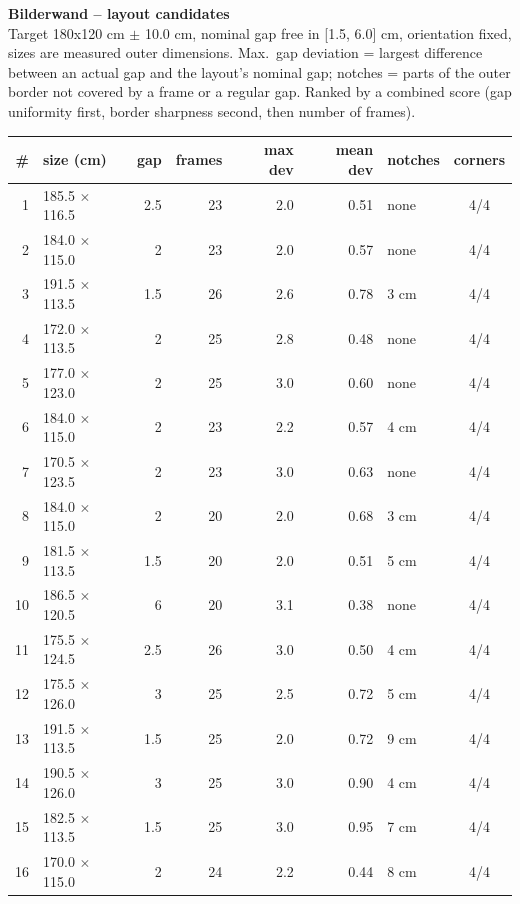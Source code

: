 \documentclass[a4paper,landscape,10pt]{article}
\begin{document}
{\LARGE\bfseries Bilderwand -- layout candidates}\\[4pt]
{\small Target 180x120 cm $\pm$ 10.0 cm, nominal gap free in
[1.5, 6.0] cm, orientation fixed, sizes are measured outer dimensions.
Max.\ gap deviation = largest difference between an actual gap and the layout's nominal gap;
notches = parts of the outer border not covered by a frame or a regular gap. Ranked by a combined
score (gap uniformity first, border sharpness second, then number of frames).}\\[10pt]
\begin{minipage}[t]{0.6\textwidth}\vspace{0pt}
\begin{tabular}{@{}r l r r r r l c@{}}
\toprule
\# & size (cm) & gap & frames & max dev & mean dev & notches & corners \\
\midrule
1 & 185.5 $\times$ 116.5 & 2.5 & 23 & 2.0 & 0.51 & none & 4/4 \\
2 & 184.0 $\times$ 115.0 & 2 & 23 & 2.0 & 0.57 & none & 4/4 \\
3 & 191.5 $\times$ 113.5 & 1.5 & 26 & 2.6 & 0.78 & 3 cm & 4/4 \\
4 & 172.0 $\times$ 113.5 & 2 & 25 & 2.8 & 0.48 & none & 4/4 \\
5 & 177.0 $\times$ 123.0 & 2 & 25 & 3.0 & 0.60 & none & 4/4 \\
6 & 184.0 $\times$ 115.0 & 2 & 23 & 2.2 & 0.57 & 4 cm & 4/4 \\
7 & 170.5 $\times$ 123.5 & 2 & 23 & 3.0 & 0.63 & none & 4/4 \\
8 & 184.0 $\times$ 115.0 & 2 & 20 & 2.0 & 0.68 & 3 cm & 4/4 \\
9 & 181.5 $\times$ 113.5 & 1.5 & 20 & 2.0 & 0.51 & 5 cm & 4/4 \\
10 & 186.5 $\times$ 120.5 & 6 & 20 & 3.1 & 0.38 & none & 4/4 \\
11 & 175.5 $\times$ 124.5 & 2.5 & 26 & 3.0 & 0.50 & 4 cm & 4/4 \\
12 & 175.5 $\times$ 126.0 & 3 & 25 & 2.5 & 0.72 & 5 cm & 4/4 \\
13 & 191.5 $\times$ 113.5 & 1.5 & 25 & 2.0 & 0.72 & 9 cm & 4/4 \\
14 & 190.5 $\times$ 126.0 & 3 & 25 & 3.0 & 0.90 & 4 cm & 4/4 \\
15 & 182.5 $\times$ 113.5 & 1.5 & 25 & 3.0 & 0.95 & 7 cm & 4/4 \\
16 & 170.0 $\times$ 115.0 & 2 & 24 & 2.2 & 0.44 & 8 cm & 4/4 \\
\bottomrule
\end{tabular}
\end{minipage}\hfill
\end{document}
